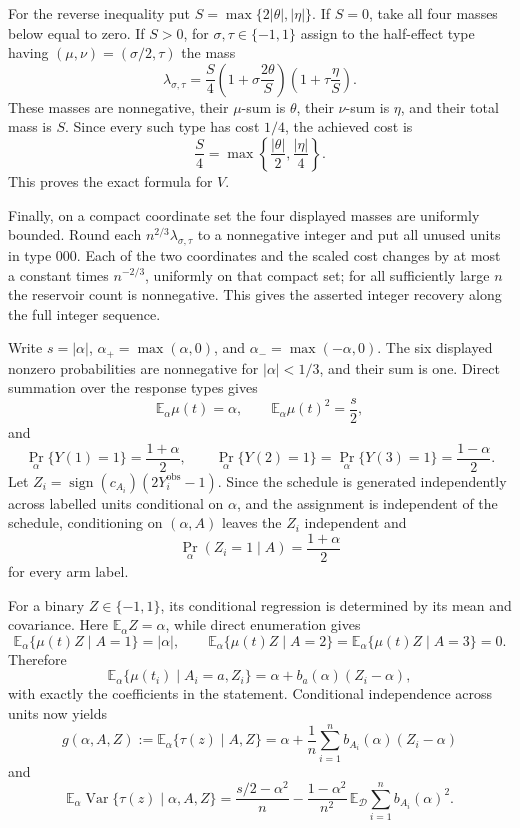 For the reverse inequality put \(S=\max\{2|\theta|,|\eta|\}\).  If \(S=0\), take all four masses below equal to zero.  If \(S>0\), for \(\sigma,\tau\in\{-1,1\}\) assign to the half-effect type having \((\mu,\nu)=(\sigma/2,\tau)\) the mass
\[
 \lambda_{\sigma,\tau}
 =\frac S4\left(1+\sigma\frac{2\theta}{S}\right)
             \left(1+\tau\frac{\eta}{S}\right).
\]
These masses are nonnegative, their \(\mu\)-sum is \(\theta\), their \(\nu\)-sum is \(\eta\), and their total mass is \(S\).  Since every such type has cost \(1/4\), the achieved cost is
\[
 \frac S4=\max\left\{\frac{|\theta|}{2},\frac{|\eta|}{4}\right\}.
\]
This proves the exact formula for \(V\).

Finally, on a compact coordinate set the four displayed masses are uniformly bounded.  Round each \(n^{2/3}\lambda_{\sigma,\tau}\) to a nonnegative integer and put all unused units in type \(000\).  Each of the two coordinates and the scaled cost changes by at most a constant times \(n^{-2/3}\), uniformly on that compact set; for all sufficiently large \(n\) the reservoir count is nonnegative.  This gives the asserted integer recovery along the full integer sequence.

Write \(s=|\alpha|\), \(\alpha_+=\max(\alpha,0)\), and \(\alpha_-=\max(-\alpha,0)\).  The six displayed nonzero probabilities are nonnegative for \(|\alpha|<1/3\), and their sum is one.  Direct summation over the response types gives
\[
\mathbb E_\alpha\mu(t)=\alpha,\qquad
\mathbb E_\alpha\mu(t)^2=\frac{s}{2},
\]
and
\[
\Pr_\alpha\{Y(1)=1\}=\frac{1+\alpha}{2},\qquad
\Pr_\alpha\{Y(2)=1\}=\Pr_\alpha\{Y(3)=1\}=\frac{1-\alpha}{2}.
\]
Let \(Z_i=\operatorname{sign}(c_{A_i})(2Y_i^{\mathrm{obs}}-1)\).  Since the schedule is generated independently across labelled units conditional on \(\alpha\), and the assignment is independent of the schedule, conditioning on \((\alpha,A)\) leaves the \(Z_i\) independent and
\[
 \Pr_\alpha(Z_i=1\mid A)=\frac{1+\alpha}{2}
\]
for every arm label.

For a binary \(Z\in\{-1,1\}\), its conditional regression is determined by its mean and covariance.  Here \(\mathbb E_\alpha Z=\alpha\), while direct enumeration gives
\[
\mathbb E_\alpha\{\mu(t)Z\mid A=1\}=|\alpha|,
\qquad
\mathbb E_\alpha\{\mu(t)Z\mid A=2\}
=\mathbb E_\alpha\{\mu(t)Z\mid A=3\}=0.
\]
Therefore
\[
\mathbb E_\alpha\{\mu(t_i)\mid A_i=a,Z_i\}
=\alpha+b_a(\alpha)(Z_i-\alpha),
\]
with exactly the coefficients in the statement.  Conditional independence across units now yields
\[
g(\alpha,A,Z):=\mathbb E_\alpha\{\tau(z)\mid A,Z\}
=\alpha+\frac1n\sum_{i=1}^n b_{A_i}(\alpha)(Z_i-\alpha)
\]
and
\[
\mathbb E_\alpha\operatorname{Var}\{\tau(z)\mid\alpha,A,Z\}
=\frac{s/2-\alpha^2}{n}
-\frac{1-\alpha^2}{n^2}\,
  \mathbb E_{\mathcal D}\sum_{i=1}^n b_{A_i}(\alpha)^2.
\]

